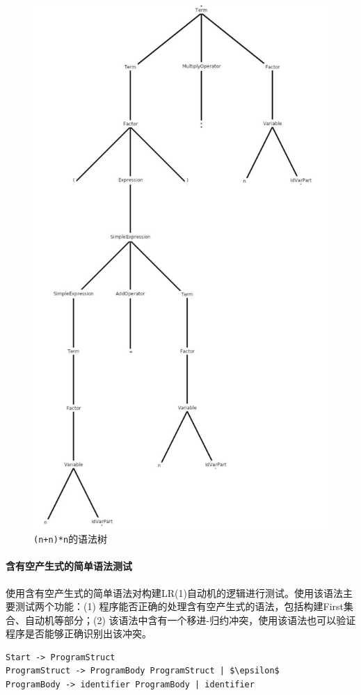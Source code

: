 \documentclass[../main.tex]{subfiles}
\begin{document}
\begin{figure}[H]
    \centering
    \includegraphics[width=0.7\linewidth]{assets/测试/(n+n)n语法树.jpg}
    \caption{\texttt{(n+n)*n}的语法树}
    \label{fig:grammar_1_tree_2}
\end{figure}


\paragraph{含有空产生式的简单语法测试}

使用含有空产生式的简单语法对构建LR(1)自动机的逻辑进行测试。使用该语法主要测试两个功能：(1) 程序能否正确的处理含有空产生式的语法，包括构建First集合、自动机等部分；(2) 该语法中含有一个移进-归约冲突，使用该语法也可以验证程序是否能够正确识别出该冲突。

\begin{lstlisting}[style=grammar]
Start -> ProgramStruct
ProgramStruct -> ProgramBody ProgramStruct | $\epsilon$ 
ProgramBody -> identifier ProgramBody | identifier
\end{lstlisting}
\end{document}
